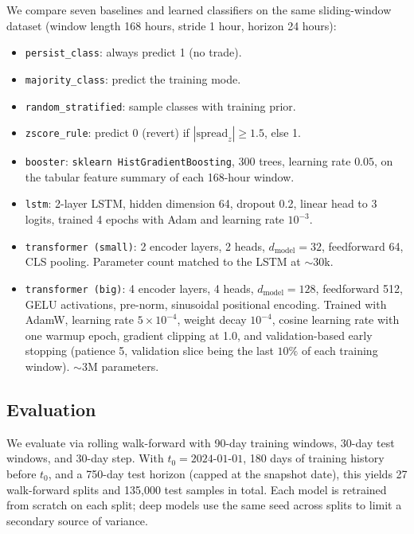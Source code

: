 \documentclass[11pt]{article}
\begin{document}
We compare seven baselines and learned classifiers on the same
sliding-window dataset (window length 168 hours, stride 1 hour,
horizon 24 hours):

\begin{itemize}
    \item \texttt{persist\_class}: always predict 1 (no trade).
    \item \texttt{majority\_class}: predict the training mode.
    \item \texttt{random\_stratified}: sample classes with training prior.
    \item \texttt{zscore\_rule}: predict 0 (revert) if
    $|\text{spread}_z| \geq 1.5$, else 1.
    \item \texttt{booster}: \texttt{sklearn HistGradientBoosting},
    300 trees, learning rate $0.05$, on the tabular feature summary
    of each 168-hour window.
    \item \texttt{lstm}: 2-layer LSTM, hidden dimension 64, dropout 0.2,
    linear head to 3 logits, trained 4 epochs with Adam and learning
    rate $10^{-3}$.
    \item \texttt{transformer (small)}: 2 encoder layers, 2 heads,
    $d_{\text{model}} = 32$, feedforward 64, CLS pooling. Parameter
    count matched to the LSTM at $\sim$30k.
    \item \texttt{transformer (big)}: 4 encoder layers, 4 heads,
    $d_{\text{model}} = 128$, feedforward 512, GELU activations,
    pre-norm, sinusoidal positional encoding. Trained with AdamW,
    learning rate $5 \times 10^{-4}$, weight decay $10^{-4}$, cosine
    learning rate with one warmup epoch, gradient clipping at 1.0, and
    validation-based early stopping (patience 5, validation slice
    being the last $10\%$ of each training window). $\sim$3M parameters.
\end{itemize}

\subsection{Evaluation}

We evaluate via rolling walk-forward with 90-day training windows,
30-day test windows, and 30-day step. With $t_0 = 2024\text{-}01\text{-}01$,
180 days of training history before $t_0$, and a 750-day test horizon
(capped at the snapshot date), this yields 27 walk-forward splits and
135{,}000 test samples in total. Each model is retrained from scratch
on each split; deep models use the same seed across splits to limit a
secondary source of variance.
\end{document}
